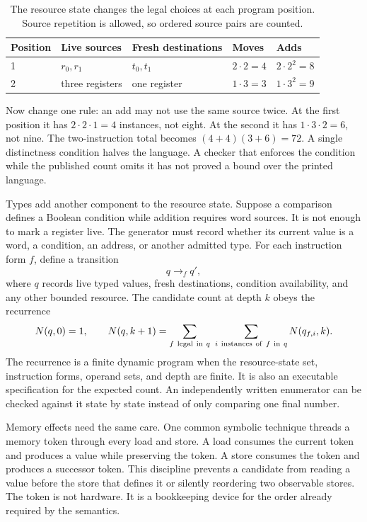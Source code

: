 \begin{table}[htbp]
\centering
\caption{The resource state changes the legal choices at each program
position. Source repetition is allowed, so ordered source pairs are counted.}
\begin{tabular}{@{}lllll@{}}
\toprule
Position & Live sources & Fresh destinations & Moves & Adds \\
\midrule
1 & \(r_0,r_1\) & \(t_0,t_1\) & \(2\cdot2=4\) & \(2\cdot2^2=8\) \\
2 & three registers & one register & \(1\cdot3=3\) & \(1\cdot3^2=9\) \\
\bottomrule
\end{tabular}
\label{tab:resource-dependent-grammar}
\end{table}

Now change one rule: an add may not use the same source twice. At the first
position it has \(2\cdot2\cdot1=4\) instances, not eight. At the second it has
\(1\cdot3\cdot2=6\), not nine. The two-instruction total becomes
\((4+4)(3+6)=72\). A single distinctness condition halves the language. A
checker that enforces the condition while the published count omits it has not
proved a bound over the printed language.

Types add another component to the resource state. Suppose a comparison
defines a Boolean condition while addition requires word sources. It is not
enough to mark a register live. The generator must record whether its current
value is a word, a condition, an address, or another admitted type. For each
instruction form \(f\), define a transition
\[
  q \mathrel{\longrightarrow_f} q',
\]
where \(q\) records live typed values, fresh destinations, condition
availability, and any other bounded resource. The candidate count at depth
\(k\) obeys the recurrence
\[
  N(q,0)=1,\qquad
  N(q,k+1)=\sum_{f\ {\rm legal\ in}\ q}
           \ \sum_{i\ {\rm instances\ of}\ f\ {\rm in}\ q} N(q_{f,i},k).
\]
The recurrence is a finite dynamic program when the resource-state set,
instruction forms, operand sets, and depth are finite. It is also an executable
specification for the expected count. An independently written enumerator can
be checked against it state by state instead of only comparing one final
number.

Memory effects need the same care. One common symbolic technique threads a
memory token through every load and store. A load consumes the current token
and produces a value while preserving the token. A store consumes the token
and produces a successor token. This discipline prevents a candidate from
reading a value before the store that defines it or silently reordering two
observable stores. The token is not hardware. It is a bookkeeping device for
the order already required by the semantics.


